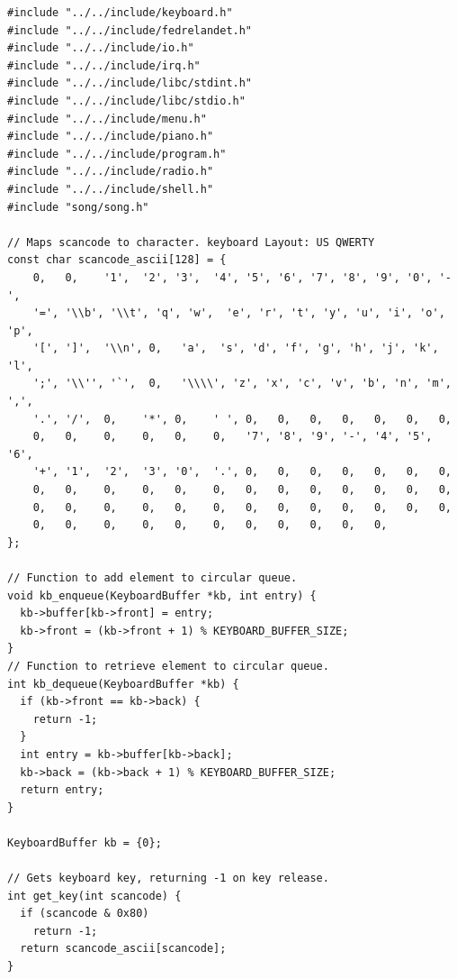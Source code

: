 \documentclass[../main.tex]{subfiles}
\begin{document}
\begin{listing}[H]
    \begin{verbatim}
#include "../../include/keyboard.h"
#include "../../include/fedrelandet.h"
#include "../../include/io.h"
#include "../../include/irq.h"
#include "../../include/libc/stdint.h"
#include "../../include/libc/stdio.h"
#include "../../include/menu.h"
#include "../../include/piano.h"
#include "../../include/program.h"
#include "../../include/radio.h"
#include "../../include/shell.h"
#include "song/song.h"

// Maps scancode to character. keyboard Layout: US QWERTY
const char scancode_ascii[128] = {
    0,   0,    '1',  '2', '3',  '4', '5', '6', '7', '8', '9', '0', '-',
    '=', '\\b', '\\t', 'q', 'w',  'e', 'r', 't', 'y', 'u', 'i', 'o', 'p',
    '[', ']',  '\\n', 0,   'a',  's', 'd', 'f', 'g', 'h', 'j', 'k', 'l',
    ';', '\\'', '`',  0,   '\\\\', 'z', 'x', 'c', 'v', 'b', 'n', 'm', ',',
    '.', '/',  0,    '*', 0,    ' ', 0,   0,   0,   0,   0,   0,   0,
    0,   0,    0,    0,   0,    0,   '7', '8', '9', '-', '4', '5', '6',
    '+', '1',  '2',  '3', '0',  '.', 0,   0,   0,   0,   0,   0,   0,
    0,   0,    0,    0,   0,    0,   0,   0,   0,   0,   0,   0,   0,
    0,   0,    0,    0,   0,    0,   0,   0,   0,   0,   0,   0,   0,
    0,   0,    0,    0,   0,    0,   0,   0,   0,   0,   0,
};

// Function to add element to circular queue.
void kb_enqueue(KeyboardBuffer *kb, int entry) {
  kb->buffer[kb->front] = entry;
  kb->front = (kb->front + 1) % KEYBOARD_BUFFER_SIZE;
}
// Function to retrieve element to circular queue.
int kb_dequeue(KeyboardBuffer *kb) {
  if (kb->front == kb->back) {
    return -1;
  }
  int entry = kb->buffer[kb->back];
  kb->back = (kb->back + 1) % KEYBOARD_BUFFER_SIZE;
  return entry;
}

KeyboardBuffer kb = {0};

// Gets keyboard key, returning -1 on key release.
int get_key(int scancode) {
  if (scancode & 0x80)
    return -1;
  return scancode_ascii[scancode];
}


\end{verbatim}
\end{listing}
\end{document}
